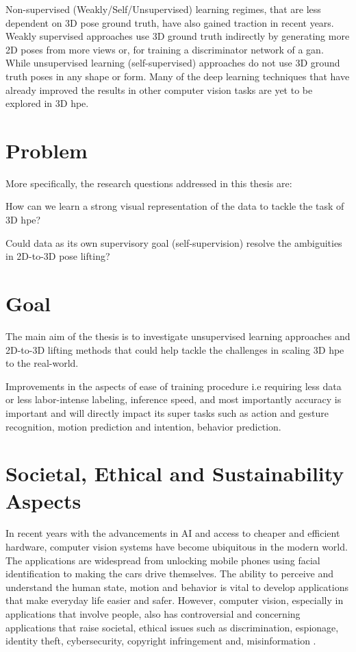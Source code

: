 Non-supervised (Weakly/Self/Unsupervised) learning regimes, that are less dependent on 3D pose ground truth, have also gained traction in recent years. Weakly supervised approaches use 3D ground truth indirectly by generating more 2D poses from more views or, for training a discriminator network of a \ac{gan}. While unsupervised learning (self-supervised) approaches do not use 3D ground truth poses in any shape or form. Many of the deep learning techniques that have already improved the results in other computer vision tasks are yet to be explored in 3D \ac{hpe}. 

\section{Problem}
\label{sec:problem}
More specifically, the research questions addressed in this thesis are: 
\begin{compactenum}
\item How can we learn a strong visual representation of the data to tackle the task of 3D \ac{hpe}?
\item Could data as its own supervisory goal (self-supervision) resolve the ambiguities in 2D-to-3D pose lifting?
\end{compactenum}

\section{Goal}
\label{sec:goal}
The main aim of the thesis is to investigate unsupervised learning approaches and 2D-to-3D lifting methods that could help tackle the challenges in scaling 3D \ac{hpe} to the real-world.

Improvements in the aspects of ease of training procedure i.e requiring less data or less labor-intense labeling, inference speed, and most importantly accuracy is important and will directly impact its super tasks such as action and gesture recognition, motion prediction and intention, behavior prediction.

\section{Societal, Ethical and Sustainability Aspects}
In recent years with the advancements in AI and access to cheaper and efficient hardware, computer vision systems have become ubiquitous in the modern world. The applications are widespread from unlocking mobile phones using facial identification to making the cars drive themselves. The ability to perceive and understand the human state, motion and behavior is vital to develop applications that make everyday life easier and safer. However, computer vision, especially in applications that involve people, also has controversial and concerning applications that raise societal, ethical issues such as discrimination, espionage, identity theft, cybersecurity, copyright infringement and, misinformation \cite{ethical_issues}.

